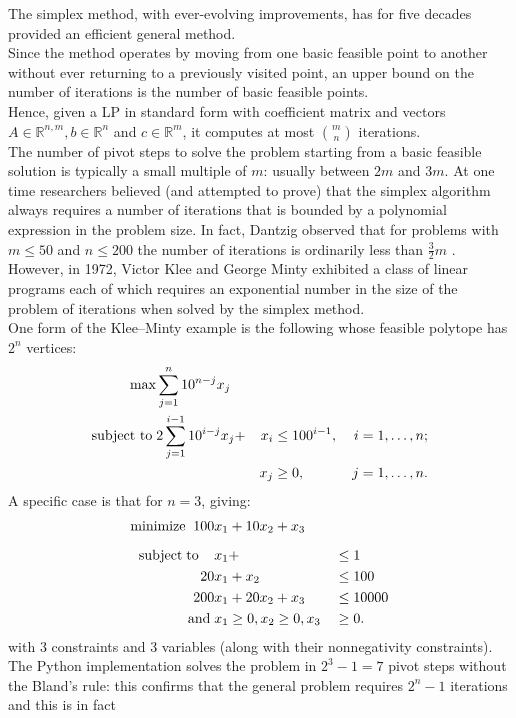\documentclass[a4paper,10 pt,titlepage,twoside]{book}
\theoremstyle{plain}
\theoremstyle{definition}
\theoremstyle{remark}
\begin{document}
The simplex method, with ever-evolving improvements, has for five decades provided an efficient general
method. \\
 Since the method operates by moving from one basic feasible point
to another without ever returning to a previously visited point, an upper bound
on the number of iterations is the number of basic feasible points.\\Hence, given a LP in standard form with
coefficient matrix and vectors $A\in\mathbb{R}^{n,m}, b\in\mathbb{R}^{n}$ and $c\in\mathbb{R}^{m}$, it computes at most $m\choose n$ iterations.\\
The number of pivot steps to solve
the problem starting from a basic feasible solution is typically a small multiple of
$m$: usually between $2m$ and $3m$. At one time researchers believed (and attempted to prove) that the simplex
algorithm always requires a number of iterations that is
bounded by a polynomial expression in the problem size. In fact, Dantzig observed that for problems with
$m \leq 50$ and $n \leq 200$ the number of iterations is ordinarily less than $\frac{3}{2}m$ \cite{DAN}.
\\ However, in 1972, Victor Klee and George Minty exhibited a class of linear programs each of which requires an
exponential number in the size of the problem of iterations when solved by the simplex method.\\
One form of the Klee–Minty example is the following whose feasible polytope has $2^{n}$
vertices:
\begin{alignat*}{2}
\max &\sum_{j=1}^{n}10^{n-j}x_{j}&&&\\
\text{subject to\;}&2\sum_{j=1}^{i-1}10^{i-j}x_{j}+&x_{i}&\leq 100^{i-1}, \, &i = 1,\dots, n;\\
&&x_{j}&\geq 0, \,&j = 1,\dots, n.\\
\end{alignat*}
A specific case is that for $n = 3$, giving:
\begin{alignat*}{2}
\text{minimize\;}\; 100& x_1+10x_2+ x_3&&\\[2mm]
\text{subject\;to\;\;\;\;} &x_1+&&\leq 1\\
						20& x_1+x_2&&\leq 100\\
200 &x_1 +20x_2 +x_{3}&&\leq 10000\\
\text{and}\;& x_1\geq 0,x_2\geq 0,x_3&&\geq 0.
\end{alignat*}
with 3 constraints and 3 variables (along with their nonnegativity constraints).\\
The Python implementation solves the problem in $2^{3} - 1 = 7$ pivot steps without the Bland's rule: this confirms that the general problem requires $2^{n}- 1$ iterations and this is in fact
\end{document}
